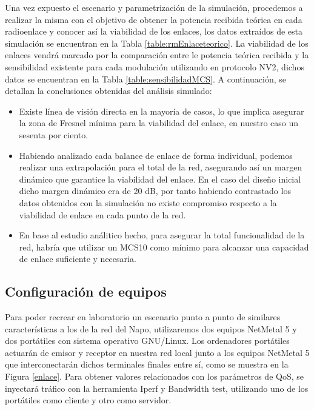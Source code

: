 	Una vez expuesto el escenario y parametrización de la simulación, procedemos a realizar la misma con el objetivo de obtener la potencia recibida teórica en cada radioenlace y conocer así la viabilidad de los enlaces, los datos extraídos de esta simulación se encuentran en la Tabla \ref{table:rmEnlaceteorico}. La viabilidad de los enlaces vendrá marcado por la comparación entre le potencia teórica recibida y la sensibilidad existente para cada modulación utilizando en protocolo NV2, dichos datos se encuentran en la Tabla \ref{table:sensibilidadMCS}. A continuación, se detallan la conclusiones obtenidas del análisis simulado: 
	\begin{itemize}
		\item Existe línea de visión directa en la mayoría de casos, lo que implica asegurar la zona de Fresnel mínima para la viabilidad del enlace, en nuestro caso un sesenta por ciento.
		\item Habiendo analizado cada balance de enlace de forma individual, podemos realizar una extrapolación para el total de la red, asegurando así un margen dinámico que garantice la viabilidad del enlace. En el caso del diseño inicial dicho margen dinámico era de 20 dB, por tanto habiendo contrastado los datos obtenidos con la simulación no existe compromiso respecto a la viabilidad de enlace en cada punto de la red.
		\item En base al estudio análitico hecho, para asegurar la total funcionalidad de la red, habría que utilizar un MCS10 como mínimo para alcanzar una capacidad de enlace suficiente y necesaria.
	\end{itemize}
	
\subsection{Configuración de equipos}
Para poder recrear en laboratorio un escenario punto a punto de similares características a los de la red del Napo, utilizaremos dos equipos NetMetal 5 y dos portátiles con sistema operativo GNU/Linux. Los ordenadores portátiles actuarán de emisor y receptor en nuestra red local junto a los equipos NetMetal 5 que interconectarán dichos terminales finales entre sí, como se muestra en la Figura \ref{enlace}. Para obtener valores relacionados con los parámetros de QoS, se inyectará tráfico con la herramienta Iperf y Bandwidth test, utilizando uno de los portátiles como cliente y otro como servidor.\\\\

